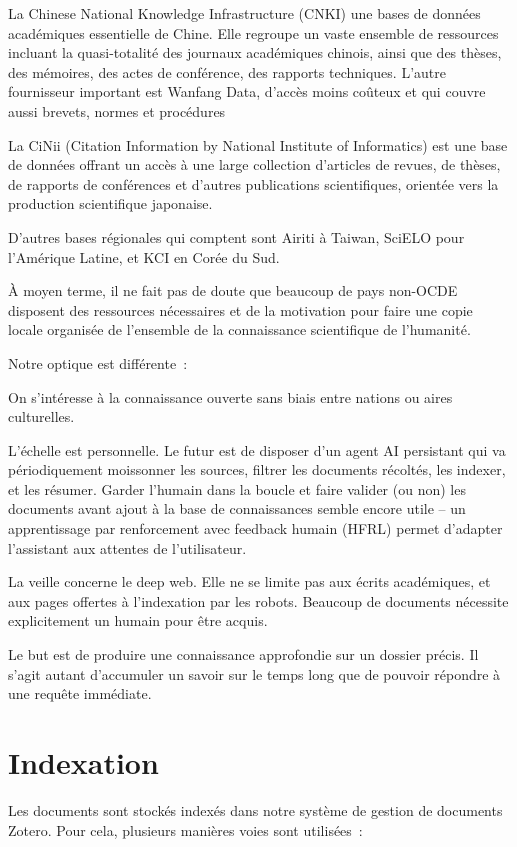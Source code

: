 \documentclass[a4paper,11pt]{report}
\begin{document}
La Chinese National Knowledge Infrastructure (CNKI) une bases de données académiques essentielle de Chine. Elle regroupe un vaste ensemble de ressources incluant la quasi-totalité des journaux académiques chinois, ainsi que des thèses, des mémoires, des actes de conférence, des rapports techniques. L'autre fournisseur important est Wanfang Data, d'accès moins coûteux et qui couvre aussi brevets, normes et procédures

La CiNii (Citation Information by National Institute of Informatics) est une base de données offrant un accès à une large collection d'articles de revues, de thèses, de rapports de conférences et d'autres publications scientifiques, orientée vers la production scientifique japonaise.

D'autres bases régionales qui comptent sont Airiti à Taiwan, SciELO pour l'Amérique Latine, et KCI en Corée du Sud.

À moyen terme, il ne fait pas de doute que beaucoup de pays non-OCDE disposent des ressources nécessaires et de la motivation pour faire une copie locale organisée de l'ensemble de la connaissance scientifique de l'humanité.

Notre optique est différente~:

On s'intéresse à la connaissance ouverte sans biais entre nations ou aires culturelles.

L'échelle est personnelle. Le futur est de disposer d'un agent AI persistant qui va périodiquement moissonner les sources, filtrer les documents récoltés, les indexer, et les résumer. Garder l'humain dans la boucle et faire valider (ou non) les documents avant ajout à la base de connaissances semble encore utile -- un apprentissage par renforcement avec feedback humain (HFRL) permet d'adapter l'assistant aux attentes de l'utilisateur.

La veille concerne le deep web. Elle ne se limite pas aux écrits académiques, et aux pages offertes à l'indexation par les robots. Beaucoup de documents nécessite explicitement un humain pour être acquis.

Le but est de produire une connaissance approfondie sur un dossier précis. Il s'agit autant d'accumuler un savoir sur le temps long que de pouvoir répondre à une requête immédiate.

\section{Indexation}\label{indexation}

Les documents sont stockés indexés dans notre système de gestion de documents Zotero. Pour cela, plusieurs manières voies sont utilisées~:
\end{document}
